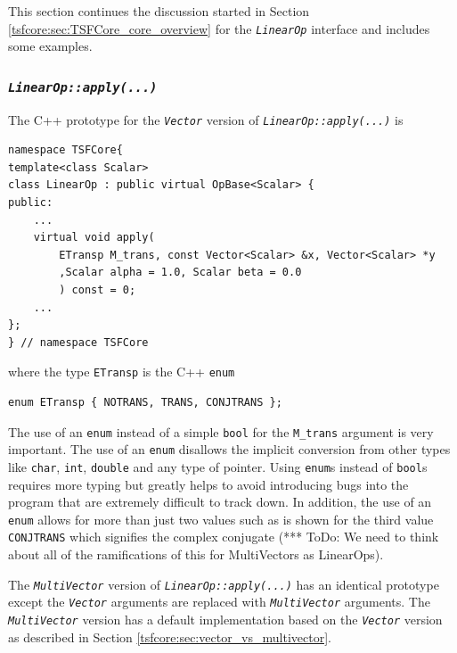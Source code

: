 This section continues the discussion started in Section
\ref{tsfcore:sec:TSFCore_core_overview} for the
\texttt{\textit{LinearOp}} interface and includes some examples.

%
\subsubsection{\texttt{\textit{LinearOp::apply(\-...)}}}
\label{tsfcore:sec:linear_op_apply}
%

The C++ prototype for the \texttt{\textit{Vector}} version of
\texttt{\textit{LinearOp\-::apply(\-...)}} is

{\tiny\begin{verbatim}
namespace TSFCore{
template<class Scalar>
class LinearOp : public virtual OpBase<Scalar> {
public:
    ...
    virtual void apply(
        ETransp M_trans, const Vector<Scalar> &x, Vector<Scalar> *y
        ,Scalar alpha = 1.0, Scalar beta = 0.0
        ) const = 0;
    ...
};
} // namespace TSFCore
\end{verbatim}}

where the type \texttt{ETransp} is the C++ \texttt{enum}

{\tiny\begin{verbatim}
enum ETransp { NOTRANS, TRANS, CONJTRANS };
\end{verbatim}}

The use of an \texttt{enum} instead of a simple \texttt{bool} for the
\texttt{M\_trans} argument is very important.  The use of an \texttt{enum}
disallows the implicit conversion from other types like \texttt{char},
\texttt{int}, \texttt{double} and any type of pointer.  Using
\texttt{enum}s instead of \texttt{bool}s requires more typing but
greatly helps to avoid introducing bugs into the program that are
extremely difficult to track down.  In addition, the use of an
\texttt{enum} allows for more than just two values such as is shown
for the third value \texttt{CONJTRANS} which signifies the complex
conjugate (*** ToDo: We need to think about all of the ramifications
of this for MultiVectors as LinearOps).

The \texttt{\textit{Multi\-Vector}} version of
\texttt{\textit{LinearOp\-::apply(\-...)}} has an identical prototype
except the \texttt{\textit{Vector}} arguments are replaced with
\texttt{\textit{Multi\-Vector}} arguments.  The \texttt{\textit{Multi\-Vector}}
version has a default implementation based on the
\texttt{\textit{Vector}} version as described in Section
\ref{tsfcore:sec:vector_vs_multivector}.


